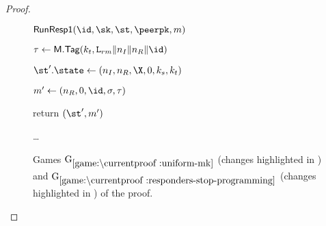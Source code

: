 \begin{proof}
\begin{figure}[tp]
\begin{minipage}[t]{0.49\textwidth}
\begin{oracle}{$\RunRespI(\id,\sk,\st,\peerpk,m)$}
        \iffull
          \item $\tau \gets \MACScheme.\MACTag(\kt, \labelrm\|\nonce_I\|\nonce_R\|\id)$
          \item $\st'.\state \gets (\nonce_I,\nonce_R,\X,\Y,\ks,\kt)$
          \item $m' \gets (\nonce_R, \Y, \id, \sigma, \tau)$
          \item return $(\st', m')$
        \else
          \item \dots
        \fi
        \end{oracle}
    \end{minipage}
  	\caption[]{%
		Games $\lblGm{uniform-mk}$ (changes highlighted in ) and $\lblGm{responders-stop-programming}$ (changes highlighted in ) of the \SIGMAI proof.
  	}
  	\label{fig:SIGMAI-proof:game:uniform-mk}
  	\label{fig:SIGMAI-proof:game:responders-stop-programming}
\end{figure}

\begin{figure}[tp]
  \centering
\end{figure}
\end{proof}
